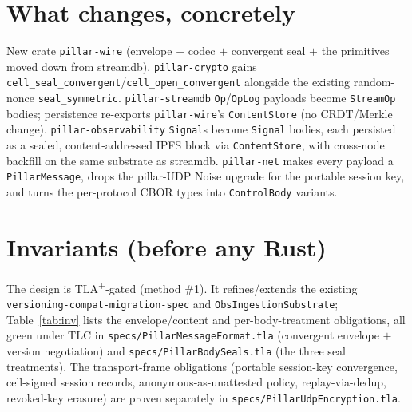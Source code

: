 \documentclass[10pt,twocolumn]{article}
\newcommand{\code}[1]{\texttt{\small #1}}
\begin{document}
\section{What changes, concretely}
New crate \code{pillar-wire} (envelope $+$ codec $+$ convergent seal $+$ the
primitives moved down from streamdb). \code{pillar-crypto} gains
\code{cell\_seal\_convergent}/\code{cell\_open\_convergent} alongside the existing
random-nonce \code{seal\_symmetric}. \code{pillar-streamdb} \code{Op}/\code{OpLog}
payloads become \code{StreamOp} bodies; persistence re-exports \code{pillar-wire}'s
\code{ContentStore} (no CRDT/Merkle change). \code{pillar-observability}
\code{Signal}s become \code{Signal} bodies, each persisted as a sealed,
content-addressed IPFS block via \code{ContentStore}, with cross-node backfill on
the same substrate as streamdb. \code{pillar-net} makes every payload a
\code{PillarMessage}, drops the pillar-UDP Noise upgrade for the portable session
key, and turns the per-protocol CBOR types into \code{ControlBody} variants.

\section{Invariants (before any Rust)}
The design is TLA\textsuperscript{+}-gated (method \#1). It refines/extends the
existing \code{versioning-compat-migration-spec} and \code{ObsIngestionSubstrate};
Table~\ref{tab:inv} lists the envelope/content and per-body-treatment obligations,
all green under TLC in \code{specs/PillarMessageFormat.tla} (convergent envelope $+$
version negotiation) and \code{specs/PillarBodySeals.tla} (the three seal
treatments). The transport-frame obligations (portable
session-key convergence, cell-signed session records, anonymous-as-unattested
policy, replay-via-dedup, revoked-key erasure) are proven separately in
\code{specs/PillarUdpEncryption.tla}.
\end{document}
